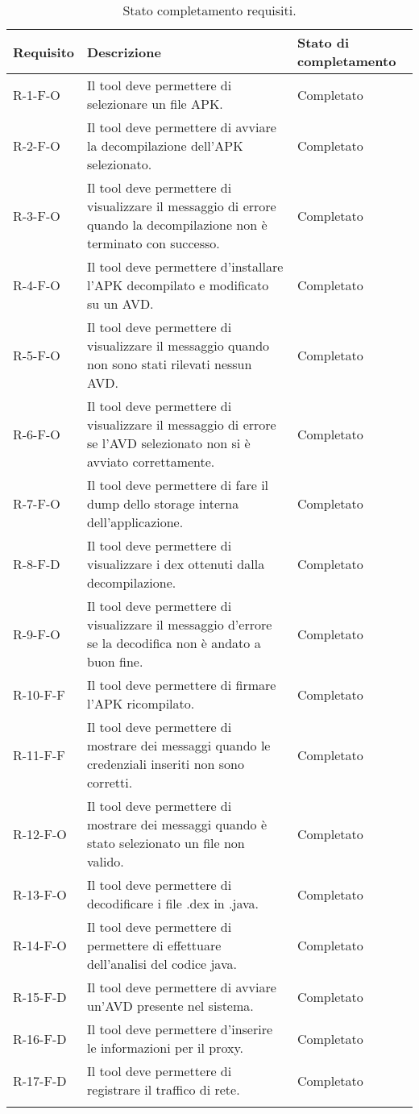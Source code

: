 \begin{longtable}{| C{3cm}|C{7cm} |C{3cm}|}
    \hline
    \textbf{Requisito} & \textbf{Descrizione}                                & \textbf{Stato di completamento} \\\hline
    R-1-F-O            & Il tool deve permettere di selezionare un file APK. & Completato                      \\\hline
    R-2-F-O & Il tool deve permettere di avviare la decompilazione dell'APK selezionato.
    & Completato \\\hline
    R-3-F-O & Il tool deve permettere di visualizzare il messaggio di errore quando la decompilazione non è terminato con successo.
    & Completato \\\hline
    R-4-F-O & Il tool deve permettere d'installare l'APK decompilato e modificato su un AVD.
    & Completato \\\hline
    R-5-F-O & Il tool deve permettere di visualizzare il messaggio quando non sono stati rilevati nessun AVD.
    & Completato \\\hline
    R-6-F-O & Il tool deve permettere di visualizzare il messaggio di errore se l'AVD selezionato non si è avviato correttamente.
    & Completato \\\hline
    R-7-F-O & Il tool deve permettere di fare il dump dello storage interna dell'applicazione.
    & Completato \\\hline
    R-8-F-D & Il tool deve permettere di visualizzare i dex ottenuti dalla decompilazione.
    & Completato \\\hline
    R-9-F-O & Il tool deve permettere di visualizzare il messaggio d'errore se la decodifica non è andato a buon fine.
    & Completato \\\hline
    R-10-F-F & Il tool deve permettere di firmare l'APK ricompilato.
    & Completato \\\hline
    R-11-F-F & Il tool deve permettere di mostrare dei messaggi quando le credenziali inseriti non sono corretti.
    & Completato \\\hline
    R-12-F-O & Il tool deve permettere di mostrare dei messaggi quando è stato selezionato un file non valido.
    & Completato \\\hline
    R-13-F-O & Il tool deve permettere di decodificare i file .dex in .java.
    & Completato \\\hline
    R-14-F-O & Il tool deve permettere di permettere di effettuare dell'analisi del codice java.
    & Completato \\\hline
    R-15-F-D & Il tool deve permettere di avviare un'AVD presente nel sistema.
    & Completato \\\hline
    R-16-F-D & Il tool deve permettere d'inserire le informazioni per il proxy.
    & Completato \\\hline
    R-17-F-D & Il tool deve permettere di registrare il traffico di rete.
    & Completato \\\hline
    \caption{Stato completamento requisiti.}
\end{longtable}

